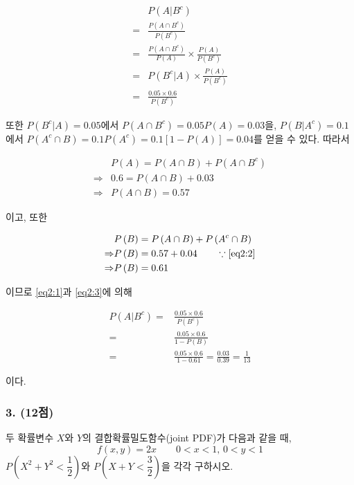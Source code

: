 \begin{align}
	& P\left(A|B^c\right) \nonumber \\
	=& \frac{P\left(A \cap B^c\right)}{P\left(B^c\right)} \nonumber \\
	=& \frac{P\left(A \cap B^c\right)}{P\left(A\right)} \times \frac{P\left(A\right)}{P\left(B^c\right)} \nonumber \\
	=& P\left(B^c|A\right) \times \frac{P\left(A\right)}{P\left(B^c\right)} \nonumber \\
	=& \frac{0.05 \times 0.6}{P\left(B^c\right)} \label{eq2:1}
\end{align}

또한 $P\left(B^c|A\right) = 0.05$에서 $P\left(A \cap B^c\right) = 0.05P\left(A\right) = 0.03$을,
$P\left(B|A^c\right) = 0.1$에서 $P\left(A^c \cap B\right) = 0.1P\left(A^c\right) = 0.1\left[1 - P\left(A\right)\right] = 0.04$를 얻을 수 있다.
따라서

\begin{align}
	&P\left(A\right) = P\left(A \cap B\right) + P\left(A \cap B^c\right) \nonumber \\
	\Rightarrow& 0.6 = P\left(A \cap B\right) + 0.03 \nonumber \\
	\Rightarrow& P\left(A \cap B\right) = 0.57 \label{eq2:2}
\end{align}

이고, 또한

\begin{align}
	&P\left(B\right) = P\left(A \cap B\right) + P\left(A^c \cap B\right) \nonumber \\
	\Rightarrow& P\left(B\right) = 0.57 + 0.04 \qquad \because \eqref{eq2:2} \nonumber \\
	\Rightarrow& P\left(B\right) = 0.61 \label{eq2:3}
\end{align}

이므로 \eqref{eq2:1}과 \eqref{eq2:3}에 의해

\begin{align*}
	P\left(A|B^c\right) =& \frac{0.05 \times 0.6}{P\left(B^c\right)} \\
	=& \frac{0.05 \times 0.6}{1 - P\left(B\right)} \\
	=& \frac{0.05 \times 0.6}{1 - 0.61} = \frac{0.03}{0.39} = \frac{1}{13}
\end{align*}

이다.

\subsubsection{3. (12점)} 두 확률변수 $X$와 $Y$의 결합확률밀도함수(joint PDF)가 다음과 같을 때,
\[f\left(x, y\right) = 2x \qquad 0<x<1,\, 0<y<1\]
$P\left(X^2+Y^2<\dfrac{1}{2}\right)$와 $P\left(X+Y<\dfrac{3}{2}\right)$을 각각 구하시오.

